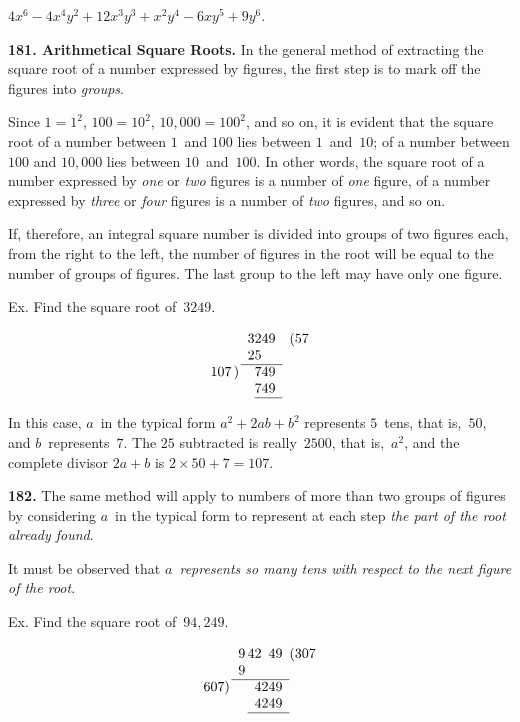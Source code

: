 \documentclass[12pt]{book}[2005/09/16]
\newcommand{\Paragraph}[1]{\medskip\par\textbf{#1}}
\newenvironment{Soln}[1][]{\par\small\textsc{#1}}{\par}
\newcommand{\Item}[1]{\vspace{4pt plus 16pt}\makebox[1em][r]{\textbf{#1}\ }}
\newcommand{\DPtypo}[2]{#2}
\newcommand{\Add}[1]{\DPtypo{}{#1}}
\begin{document}
\Item{6.}  $4x^{6} - 4x^{4}y^{2} + 12x^{3}y^{3} + x^{2}y^{4} - 6xy^{5} + 9y^{6}$.

\Paragraph{181.  Arithmetical Square Roots.}  In the general method
of extracting the square root of a number expressed by
figures, the first step is to mark off the figures into \emph{groups}.

Since $1 = 1^{2}$, $100 = 10^{2}$, $10,000 = 100^{2}$, and so on, it is
evident that the square root of a number between $1$~and
$100$ lies between $1$~and~$10$; of a number between $100$ and
$10,000$ lies between $10$~and~$100$.  In other words, the
square root of a number expressed by \emph{one} or \emph{two} figures is
a number of \emph{one} figure, of a number expressed by \emph{three} or
\emph{four} figures is a number of \emph{two} figures, and so on.

If, therefore, an integral square number is divided into
groups of two figures each, from the right to the left, the
number of figures in the root will be equal to the number
of groups of figures.  The last group to the left may have
only one figure.

Ex.  Find the square root of~$3249$.
\begin{Soln}
\[
\begin{array}{rc@{}ll}
    &3&249&(57 \\
    &2&5 \\
\cline{2-3}
107\,\rlap{)}&&749 \\
    &&749 \\
\cline{3-3}
\end{array}
\]

In this case, $a$~in the typical form $a^{2} + 2ab + b^{2}$
represents $5$~tens, that is,~$50$, and $b$~represents~$7$\Add{.} The
$25$ subtracted is really~$2500$, that is,~$a^{2}$, and the complete
divisor $2a + b$ is $2 × 50 + 7 = 107$.
\end{Soln}

\Paragraph{182.}  The same method will apply to numbers of more
than two groups of figures by considering $a$~in the typical
form to represent at each step \emph{the part of the root already
found}.

It must be observed that \emph{$a$~represents so many tens with
respect to the next figure of the root}.

Ex.  Find the square root of~$94,249$.
\begin{Soln}
\[
\begin{array}{r*{3}{c@{\,}}l}
     &9& 42&49&(307 \\
     &9 \\
\cline{2-4}
607\rlap{)} & & \multicolumn{2}{l}{4249} \\
     & & \multicolumn{2}{l}{4249} \\
\cline{3-4}
\end{array}
\]
\end{Soln}
\end{document}
